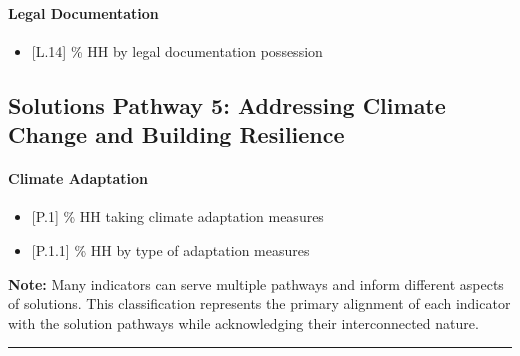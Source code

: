 \documentclass[
]{report}
\providecommand{\tightlist}{%
  \setlength{\itemsep}{0pt}\setlength{\parskip}{0pt}}
\begin{document}
\paragraph{Legal Documentation}\label{legal-documentation}

\begin{itemize}
\tightlist
\item
  {[}L.14{]} \% HH by legal documentation possession
\end{itemize}

\subsection{Solutions Pathway 5: Addressing Climate Change and Building
Resilience}\label{solutions-pathway-5-addressing-climate-change-and-building-resilience}

\paragraph{Climate Adaptation}\label{climate-adaptation}

\begin{itemize}
\tightlist
\item
  {[}P.1{]} \% HH taking climate adaptation measures
\item
  {[}P.1.1{]} \% HH by type of adaptation measures
\end{itemize}

\textbf{Note:} Many indicators can serve multiple pathways and inform
different aspects of solutions. This classification represents the
primary alignment of each indicator with the solution pathways while
acknowledging their interconnected nature.

\begin{center}\rule{0.5\linewidth}{0.5pt}\end{center}
\end{document}
